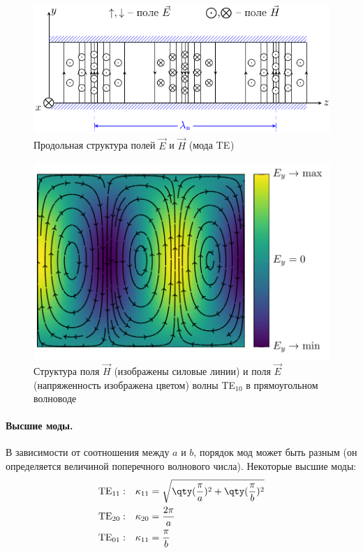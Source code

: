 \begin{figure}[H]
	\centering
	\includegraphics[width=\textwidth]{img/lect4_ris10}
	\caption{Продольная структура полей $\vec{E}$ и $\vec{H}$ (мода TE$_{}$)}
	\label{fig:lect4:10}
\end{figure}

\begin{figure}[H]
	\centering
	\includegraphics[scale=1]{img/lect4_ris11}
	\caption{Структура поля $\vec{H}$ (изображены силовые линии) и поля $\vec{E}$ (напряженность изображена цветом) волны TE$_{10}$ в прямоугольном волноводе}
	\label{fig:lect4:11}
\end{figure}

\paragraph{Высшие моды.} В зависимости от соотношения между $a$ и $b$, порядок мод может быть разным (он определяется величиной поперечного волнового числа). Некоторые высшие моды:
\begin{equation}
\begin{aligned}
 		\text{TE}_{11}:& \quad  \kappa_{11}=\sqrt{\qty(\frac{\pi}{a})^2+\qty(\frac{\pi}{b})^2}\\
 		\text{TE}_{20}:& \quad  \kappa_{20}=\frac{2\pi}{a} \\
 		\text{TE}_{01}:& \quad  \kappa_{11}=\frac{\pi}{b}
\end{aligned} 	
\end{equation} 